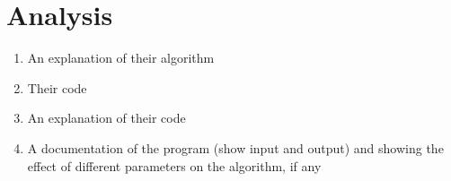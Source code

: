 \chapter{Analysis}
	\begin{enumerate}
		\item An explanation of their algorithm
		\item Their code
		\item An explanation of their code
		\item A documentation of the program (show input and output) and showing the effect of different parameters on the algorithm, if any
	\end{enumerate}